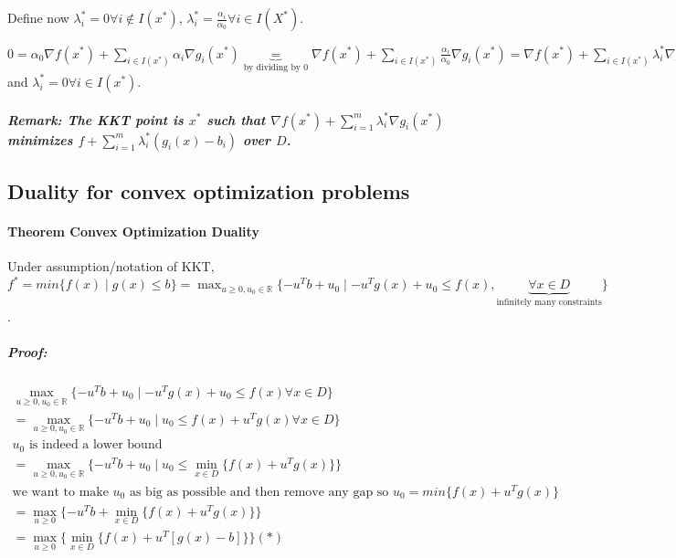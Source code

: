 \documentclass[main]{subfiles}
\begin{document}
Define now $\lambda_{i}^{*} = 0 \forall i \notin I(x^{*})$, $\lambda_{i}^{*} =
\frac{\alpha_{i}}{\alpha_{0}} \forall i \in I(X^{*})$.

$0 = \alpha_{0} \nabla f(x^{*}) + \sum_{i \in I(x^{*})} \alpha_{i} \nabla
g_{i}(x^{*}) \underbrace{=}_{\text{by dividing by $0$}} \nabla f(x^{*}) +
\sum_{i \in I(x^{*})} \frac{\alpha_{i}}{\alpha_{0}}\nabla g_{i}(x^{*}) =
\nabla f(x^{*}) + \sum_{i \in I(x^{*})} \lambda_{i}^{*} \nabla g_{i}(x^{*})$
and $ \lambda_{i}^{*} = 0 \forall i \in I(x^{*})$.

\subparagraph{Remark: The KKT point is $x^{*}$ such that $\nabla f(x^{*}) +
\sum_{i=1}^{m} \lambda_{i}^{*} \nabla g_{i}(x^{*})$ minimizes
$f + \sum_{i=1}^{m} \lambda_{i}^{*} (g_{i}(x) - b_{i})$ over $D$.}

\subsection{Duality for convex optimization problems}

\paragraph{Theorem Convex Optimization Duality}
Under assumption/notation of KKT, $f^{*} = min \{ f(x) \mid g(x) \leq b \} =
\displaystyle \max_{u \geq 0, u_{0} \in \mathbb{R}} \{-u^{T}b + u_{0}
\mid -u^{T}g(x) + u_{0} \leq f(x), \underbrace{\forall x \in D}
_{\text{infinitely many constraints}} \}$.

\subparagraph{Proof:}

\begin{gather*}
\max_{u \geq 0, u_{0} \in \mathbb{R}} \{-u^{T}b + u_{0} \mid -u^{T}g(x) + u_{0}
\leq f(x) \forall x \in D \} \\
= \max_{u \geq 0, u_{0} \in \mathbb{R}} \{-u^{T}b + u_{0} \mid u_{0} \leq f(x)
+ u^{T}g(x) \forall x \in D \} \\
\text{$u_{0}$ is indeed a lower bound} \\
= \max_{u \geq 0, u_{0} \in \mathbb{R}} \{-u^{T}b + u_{0} \mid u_{0} \leq 
\min_{x \in D} \{f(x) + u^{T}g(x)\} \} \\
\text{we want to make $u_{0}$ as big as possible and then remove any gap so 
$u_{0} = min \{f(x) + u^{T}g(x)\}$ } \\
= \max_{u \geq 0} \{-u^{T}b + \min_{x \in D} \{f(x) + u^{T}g(x)\} \} \\
= \max_{u \geq 0} \{ \min_{x \in D} \{f(x) + u^{T}[g(x) -b] \} \} (*)\\
\end{gather*}
\end{document}
